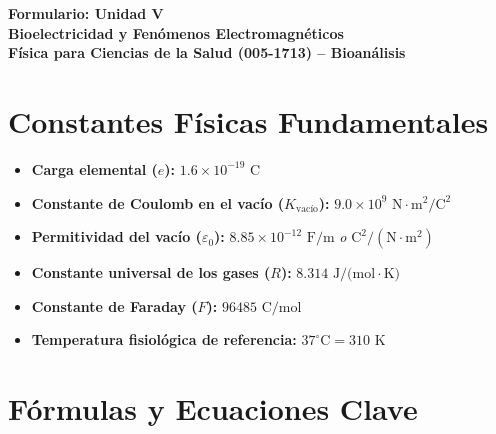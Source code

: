 \documentclass[11pt,letterpaper]{article}
\begin{document}
\begin{center}
    \textbf{\Large Formulario: Unidad V}\\
    \textbf{\large Bioelectricidad y Fenómenos Electromagnéticos}\\
    \vspace{0.2cm}
    \textbf{Física para Ciencias de la Salud (005-1713) -- Bioanálisis}\\
\end{center}

\vspace{0.5cm}

\section*{Constantes Físicas Fundamentales}
\begin{itemize}
    \item \textbf{Carga elemental ($e$):} $1.6 \times 10^{-19} \text{ C}$
    \item \textbf{Constante de Coulomb en el vacío ($K_{\text{vacío}}$):} $9.0 \times 10^9 \text{ N}\cdot\text{m}^2/\text{C}^2$
    \item \textbf{Permitividad del vacío ($\varepsilon_0$):} $8.85 \times 10^{-12} \text{ F/m}$ \textit{o} $\text{C}^2/(\text{N}\cdot\text{m}^2)$
    \item \textbf{Constante universal de los gases ($R$):} $8.314 \text{ J/(mol}\cdot\text{K)}$
    \item \textbf{Constante de Faraday ($F$):} $96485 \text{ C/mol}$
    \item \textbf{Temperatura fisiológica de referencia:} $37^\circ\text{C} = 310 \text{ K}$
\end{itemize}

\vspace{0.5cm}

\section*{Fórmulas y Ecuaciones Clave}
\end{document}
